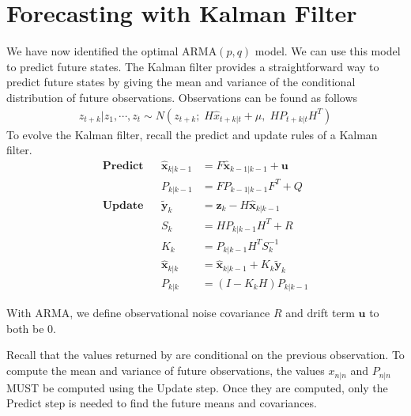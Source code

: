 \section*{Forecasting with Kalman Filter}
We have now identified the optimal ARMA$(p,q)$ model.
We can use this model to predict future states.
The Kalman filter provides a straightforward way to predict future states by giving the mean and variance of the conditional distribution of future observations.
Observations can be found as follows
\begin{align}
    z_{t + k} | z_{1}, \cdots, z_{t} \sim N(z_{t+k};\; H\hat{x}_{t+k|t} + \mu,\;
    HP_{t+k|t}H^T)
\end{align}
To evolve the Kalman filter, recall the predict and update rules of a Kalman filter.
\begin{align*}
\textbf{Predict} & & \widehat{\mathbf{x}}_{k|k-1} & = F\widehat{\mathbf{x}}_{k-1|k-1} + \mathbf{u} \\
 & & P_{k|k-1} & = FP_{k-1|k-1}F^{T} + Q \\
\textbf{Update} & & \tilde{\mathbf{y}}_{k} & = \mathbf{z}_{k} - H\widehat{\mathbf{x}}_{k|k-1} \\
 & & S_{k} & = HP_{k|k-1}H^{T} + R \\
 & & K_{k} & = P_{k|k-1}H^{T}S_{k}^{-1} \\
 & & \widehat{\mathbf{x}}_{k|k} & = \widehat{\mathbf{x}}_{k|k-1} + K_{k}\tilde{\mathbf{y}}_{k} \\
 & & P_{k|k} & = (I - K_{k}H)P_{k|k-1}
\end{align*}

\noindent With ARMA, we define observational noise covariance $R$ and drift term $\mathbf{u}$ to both be 0.

\begin{warn}
Recall that the values returned by  are conditional on the previous observation.
To compute the mean and variance of future observations, the values $x_{n|n}$ and $P_{n|n}$ MUST be computed using the Update step.
Once they are computed, only the Predict step is needed to find the future means and covariances.
\end{warn}

